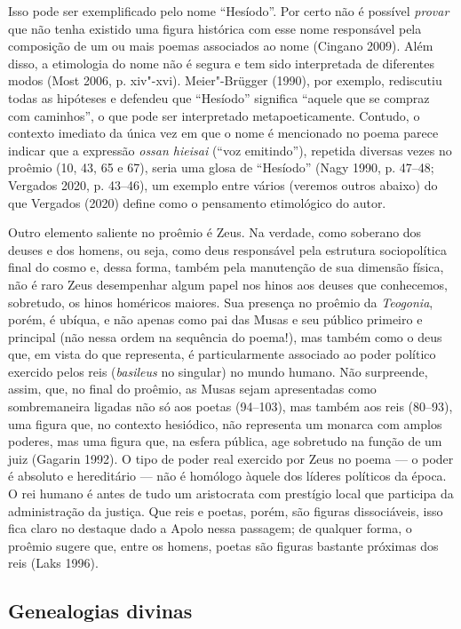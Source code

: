 Isso pode ser exemplificado pelo nome ``Hesíodo''. Por certo não é
possível \emph{provar} que não tenha existido uma figura histórica com
esse nome responsável pela composição de um ou mais poemas associados ao
nome (Cingano 2009). Além disso, a etimologia do nome não é segura e tem
sido interpretada de diferentes modos (Most 2006, p. xiv"-xvi).
Meier"-Brügger (1990), por exemplo, rediscutiu todas as hipóteses e
defendeu que ``Hesíodo'' significa ``aquele que se compraz com
caminhos'', o que pode ser interpretado metapoeticamente. Contudo, o
contexto imediato da única vez em que o nome é mencionado no poema
parece indicar que a expressão \emph{ossan hieisai} (``voz emitindo''),
repetida diversas vezes no proêmio (10, 43, 65 e 67), seria uma glosa de
``Hesíodo'' (Nagy 1990, p. 47--48; Vergados 2020, p. 43--46), um exemplo
entre vários (veremos outros abaixo) do que Vergados (2020) define como
o pensamento etimológico do autor.

Outro elemento saliente no proêmio é Zeus. Na verdade, como soberano dos
deuses e dos homens, ou seja, como deus responsável pela estrutura
sociopolítica final do cosmo e, dessa forma, também pela manutenção de
sua dimensão física, não é raro Zeus desempenhar algum papel nos hinos
aos deuses que conhecemos, sobretudo, os hinos homéricos maiores. Sua
presença no proêmio da \emph{Teogonia}, porém, é ubíqua, e não apenas
como pai das Musas e seu público primeiro e principal (não nessa ordem
na sequência do poema!), mas também como o deus que, em vista do que
representa, é particularmente associado ao poder político exercido pelos
reis (\emph{basileus} no singular) no mundo humano. Não surpreende,
assim, que, no final do proêmio, as Musas sejam apresentadas como
sombremaneira ligadas não só aos poetas (94--103), mas também aos reis
(80--93), uma figura que, no contexto hesiódico, não representa um
monarca com amplos poderes, mas uma figura que, na esfera pública, age
sobretudo na função de um juiz (Gagarin 1992). O tipo de poder real
exercido por Zeus no poema --- o poder é absoluto e hereditário --- não é
homólogo àquele dos líderes políticos da época. O rei humano é antes de
tudo um aristocrata com prestígio local que participa da administração
da justiça. Que reis e poetas, porém, são figuras dissociáveis, isso
fica claro no destaque dado a Apolo nessa passagem; de qualquer forma, o
proêmio sugere que, entre os homens, poetas são figuras bastante
próximas dos reis (Laks 1996).

\subsection{Genealogias divinas}

